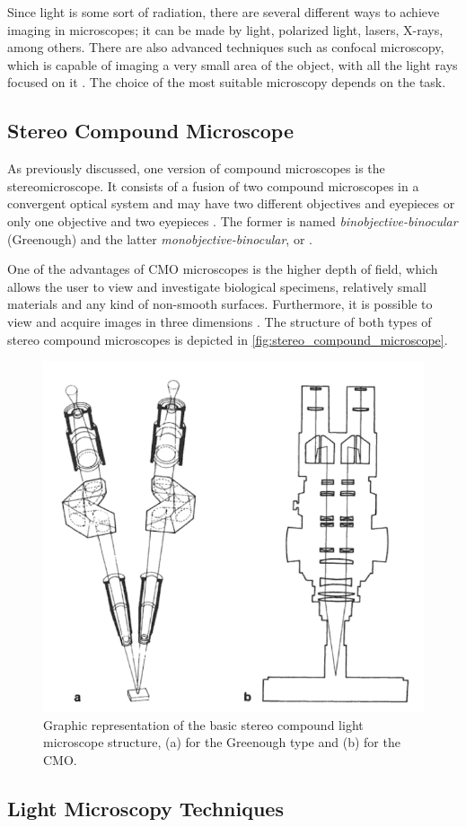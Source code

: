 Since light is some sort of radiation, there are several different ways to achieve imaging in microscopes; it can be made by light, polarized light, lasers, X-rays, among others. There are also advanced techniques such as confocal microscopy, which is capable of imaging a very small area of the object, with all the light rays focused on it \cite{rochow1994introduction}. The choice of the most suitable microscopy depends on the task.

\subsection{Stereo Compound Microscope}

As previously discussed, one version of compound microscopes is the stereomicroscope. It consists of a fusion of two compound microscopes in a convergent optical system and may have two different objectives and eyepieces or only one objective and two eyepieces \cite{schreier2004advances}. The former is named \emph{binobjective-binocular} (Greenough) and the latter \emph{monobjective-binocular}, or . 

One of the advantages of CMO microscopes is the higher depth of field, which allows the user to view and investigate biological specimens, relatively small materials and any kind of non-smooth surfaces. Furthermore, it is possible to view and acquire images in three dimensions \cite{rochow1994introduction}. The structure of both types of stereo compound microscopes is depicted in \autoref{fig:stereo_compound_microscope}.

\begin{figure}[htb]
	\centering
	\caption{\label{fig:stereo_compound_microscope} Graphic representation of the basic stereo compound light microscope structure, (a) for the Greenough type and (b) for the CMO.}
	\begin{center}
	    \includegraphics[scale=0.45]{images/fig6.png}
	\end{center}
	\centering
\end{figure}


\subsection{Light Microscopy Techniques}
